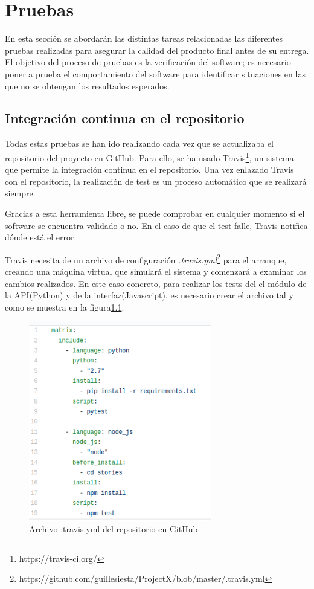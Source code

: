 \chapter{Pruebas}

En esta sección se abordarán las distintas tareas relacionadas las diferentes pruebas realizadas para asegurar la calidad del producto final antes de su entrega. El objetivo del proceso de pruebas es la verificación del software; es necesario poner a prueba el comportamiento del software para identificar situaciones en las que no se obtengan los resultados esperados.

\section{Integración continua en el repositorio}

Todas estas pruebas se han ido realizando cada vez que se actualizaba el repositorio del proyecto en GitHub. Para ello, se ha usado Travis\footnote{https://travis-ci.org/}, un sistema que permite la integración continua en el repositorio. Una vez enlazado Travis con el repositorio, la realización de test es un proceso automático que se realizará siempre.

Gracias a esta herramienta libre, se puede comprobar en cualquier momento si el software se encuentra validado o no. En el caso de que el test falle, Travis notifica dónde está el error. 

Travis necesita de un archivo de configuración \textit{.travis.yml}\footnote{https://github.com/guillesiesta/ProjectX/blob/master/.travis.yml} para el arranque, creando una máquina virtual que simulará el sistema y comenzará a examinar los cambios realizados. En este caso concreto, para realizar los tests del  el módulo de la API(Python) y de  la interfaz(Javascript), es necesario crear el archivo tal y como se muestra en la figura\ref{fig::travis}.

\begin{figure}[htbp]
    \centerline{\includegraphics[width=8cm]{figuras/travis.png}}
    \caption{Archivo .travis.yml del repositorio en GitHub}
    \label{fig::travis}
\end{figure}

